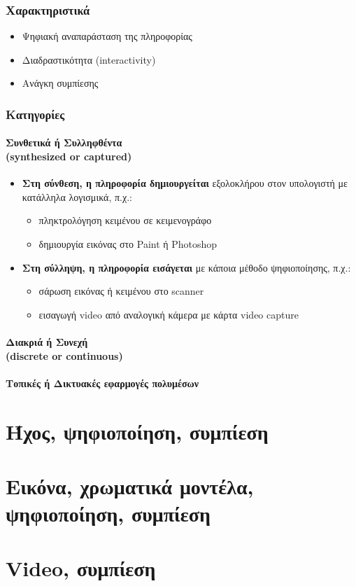 \documentclass[12pt]{report}
\begin{document}
\begin{multicols*}{2}
    \subsection{Χαρακτηριστικά}
    \begin{itemize}
        \item Ψηφιακή αναπαράσταση της πληροφορίας
        \item Διαδραστικότητα (\textlatin{interactivity})
        \item Ανάγκη συμπίεσης
    \end{itemize}
    \subsection{Κατηγορίες}
    \subsubsection{Συνθετικά ή Συλληφθέντα\\(\textlatin{synthesized or captured})}
    \begin{itemize}
        \item \textbf{Στη σύνθεση, η πληροφορία δημιουργείται} εξολοκλήρου στον υπολογιστή με κατάλληλα λογισμικά, π.χ.:
              \begin{itemize}
                  \item πληκτρολόγηση κειμένου σε κειμενογράφο
                  \item δημιουργία εικόνας στο \textlatin{Paint} ή \textlatin{Photoshop}
              \end{itemize}
        \item \textbf{Στη σύλληψη, η πληροφορία εισάγεται} με κάποια μέθοδο ψηφιοποίησης, π.χ.:
              \begin{itemize}
                  \item σάρωση εικόνας ή κειμένου στο \textlatin{scanner}
                  \item εισαγωγή \textlatin{video} από αναλογική κάμερα με κάρτα \textlatin{video capture}
              \end{itemize}
    \end{itemize}
    \subsubsection{Διακριά ή Συνεχή\\(\textlatin{discrete or continuous})}
    \subsubsection{Τοπικές ή Δικτυακές εφαρμογές πολυμέσων}
\end{multicols*}
\newpage
\chapter{Ήχος, ψηφιοποίηση, συμπίεση}
\newpage
\newpage
\chapter{Εικόνα, χρωματικά μοντέλα, ψηφιοποίηση, συμπίεση}
\newpage
\newpage
\chapter{\textlatin{Video}, συμπίεση}
\newpage
\newpage
\end{document}
